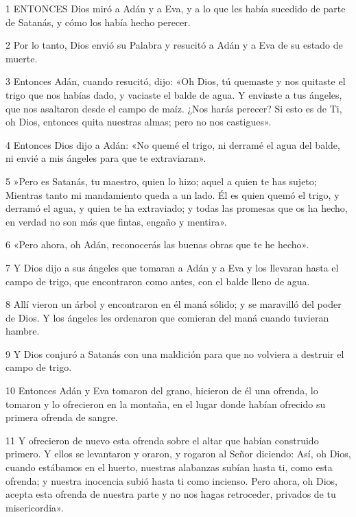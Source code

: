 \par 1 ENTONCES Dios miró a Adán y a Eva, y a lo que les había sucedido de parte de Satanás, y cómo los había hecho perecer.

\par 2 Por lo tanto, Dios envió su Palabra y resucitó a Adán y a Eva de su estado de muerte.

\par 3 Entonces Adán, cuando resucitó, dijo: «Oh Dios, tú quemaste y nos quitaste el trigo que nos habías dado, y vaciaste el balde de agua. Y enviaste a tus ángeles, que nos asaltaron desde el campo de maíz. ¿Nos harás perecer? Si esto es de Ti, oh Dios, entonces quita nuestras almas; pero no nos castigues».

\par 4 Entonces Dios dijo a Adán: «No quemé el trigo, ni derramé el agua del balde, ni envié a mis ángeles para que te extraviaran».

\par 5 »Pero es Satanás, tu maestro, quien lo hizo; aquel a quien te has sujeto; Mientras tanto mi mandamiento queda a un lado. Él es quien quemó el trigo, y derramó el agua, y quien te ha extraviado; y todas las promesas que os ha hecho, en verdad no son más que fintas, engaño y mentira».

\par 6 «Pero ahora, oh Adán, reconocerás las buenas obras que te he hecho».

\par 7 Y Dios dijo a sus ángeles que tomaran a Adán y a Eva y los llevaran hasta el campo de trigo, que encontraron como antes, con el balde lleno de agua.

\par 8 Allí vieron un árbol y encontraron en él maná sólido; y se maravilló del poder de Dios. Y los ángeles les ordenaron que comieran del maná cuando tuvieran hambre.

\par 9 Y Dios conjuró a Satanás con una maldición para que no volviera a destruir el campo de trigo.

\par 10 Entonces Adán y Eva tomaron del grano, hicieron de él una ofrenda, lo tomaron y lo ofrecieron en la montaña, en el lugar donde habían ofrecido su primera ofrenda de sangre.

\par 11 Y ofrecieron de nuevo esta ofrenda sobre el altar que habían construido primero. Y ellos se levantaron y oraron, y rogaron al Señor diciendo: Así, oh Dios, cuando estábamos en el huerto, nuestras alabanzas subían hasta ti, como esta ofrenda; y nuestra inocencia subió hasta ti como incienso. Pero ahora, oh Dios, acepta esta ofrenda de nuestra parte y no nos hagas retroceder, privados de tu misericordia».

